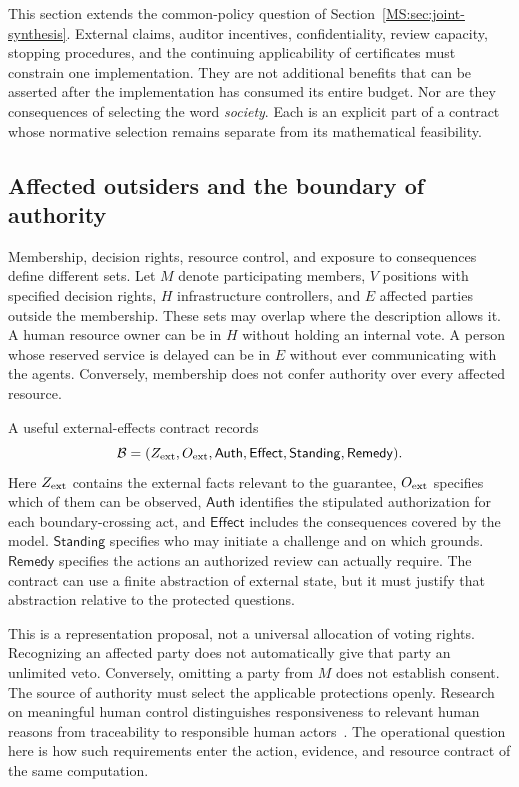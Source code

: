 This section extends the common-policy question of Section~\ref{MS:sec:joint-synthesis}. External claims, auditor incentives, confidentiality, review capacity, stopping procedures, and the continuing applicability of certificates must constrain one implementation. They are not additional benefits that can be asserted after the implementation has consumed its entire budget. Nor are they consequences of selecting the word \emph{society}. Each is an explicit part of a contract whose normative selection remains separate from its mathematical feasibility.

\subsection{Affected outsiders and the boundary of authority}\label{MS:sec:external-effects}

Membership, decision rights, resource control, and exposure to consequences define different sets. Let $M$ denote participating members, $V$ positions with specified decision rights, $H$ infrastructure controllers, and $E$ affected parties outside the membership. These sets may overlap where the description allows it. A human resource owner can be in $H$ without holding an internal vote. A person whose reserved service is delayed can be in $E$ without ever communicating with the agents. Conversely, membership does not confer authority over every affected resource.

A useful external-effects contract records
\[
\mathcal B=(Z_{\rm ext},O_{\rm ext},\mathsf{Auth},\mathsf{Effect},
\mathsf{Standing},\mathsf{Remedy}).
\]
Here $Z_{\rm ext}$ contains the external facts relevant to the guarantee, $O_{\rm ext}$ specifies which of them can be observed, $\mathsf{Auth}$ identifies the stipulated authorization for each boundary-crossing act, and $\mathsf{Effect}$ includes the consequences covered by the model. $\mathsf{Standing}$ specifies who may initiate a challenge and on which grounds. $\mathsf{Remedy}$ specifies the actions an authorized review can actually require. The contract can use a finite abstraction of external state, but it must justify that abstraction relative to the protected questions.

This is a representation proposal, not a universal allocation of voting rights. Recognizing an affected party does not automatically give that party an unlimited veto. Conversely, omitting a party from $M$ does not establish consent. The source of authority must select the applicable protections openly. Research on meaningful human control distinguishes responsiveness to relevant human reasons from traceability to responsible human actors~\cite{MS:meaningfulcontrol}. The operational question here is how such requirements enter the action, evidence, and resource contract of the same computation.

